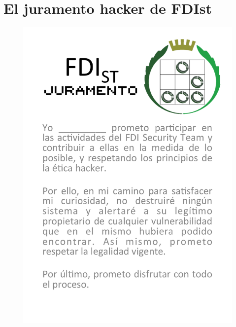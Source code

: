 \newpage
\section{El juramento hacker de FDIst}
\begin{figure}[H]
        \centering
        \includegraphics[width=0.93 \textwidth]{Media/Juramento.pdf}
\end{figure}